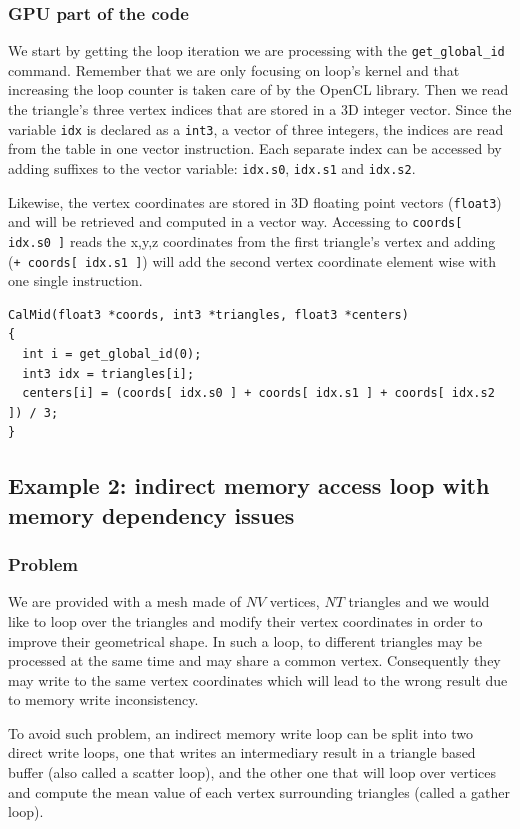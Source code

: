\documentclass[a4paper,12pt]{article}
\begin{document}
\subsubsection{GPU part of the code}
We start by getting the loop iteration we are processing with the {\tt get\_global\_id} command. Remember that we are only focusing on loop's kernel and that increasing the loop counter is taken care of by the OpenCL library.
Then we read the triangle's three vertex indices that are stored in a 3D integer vector. Since the variable {\tt idx} is declared as a {\tt int3}, a vector of three integers, the indices are read from the table in one vector instruction. Each separate index can be accessed by adding suffixes to the vector variable: {\tt idx.s0}, {\tt idx.s1} and {\tt idx.s2}.

Likewise, the vertex coordinates are stored in 3D floating point vectors ({\tt float3}) and will be retrieved and computed in a vector way. Accessing to {\tt coords[ idx.s0 ]} reads the x,y,z coordinates from the first triangle's vertex and adding 
({\tt + coords[ idx.s1 ]}) will add the second vertex coordinate element wise with one single instruction.

\begin{tt}
\begin{verbatim}
CalMid(float3 *coords, int3 *triangles, float3 *centers)
{
  int i = get_global_id(0);
  int3 idx = triangles[i];
  centers[i] = (coords[ idx.s0 ] + coords[ idx.s1 ] + coords[ idx.s2 ]) / 3;
}
\end{verbatim}
\end{tt}
\normalfont


\subsection{Example 2: indirect memory access loop with memory dependency issues}
\label{ex2}
\subsubsection{Problem}
We are provided with a mesh made of $NV$ vertices, $NT$ triangles and we would like to loop over the triangles and modify their vertex coordinates in order to improve their geometrical shape. In such a loop, to different triangles may be processed at the same time and may share a common vertex. Consequently they may write to the same vertex coordinates which will lead to the wrong result due to memory write inconsistency.

To avoid such problem, an indirect memory write loop can be split into two direct write loops, one that writes an intermediary result in a triangle based buffer (also called a scatter loop), and the other one that will loop over vertices and compute the mean value of each vertex surrounding triangles (called a gather loop).
\end{document}
